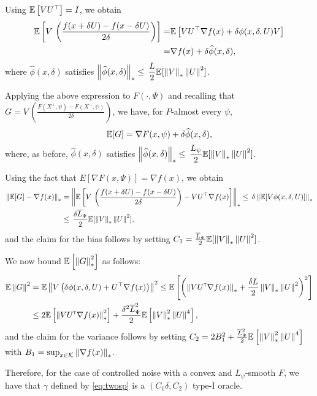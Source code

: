 Using $\mathbb{E}\left[V U^\top\right]=I$, we obtain
\begin{align*}
\mathbb{E}\left[V\,  \left(\frac{f(x+\delta U)  -f(x-\delta U)}{2\delta}\right)\right]=&
\mathbb{E}\left[ V U^\top\nabla f(x) +  \delta\phi(x,\delta,U) V \right]\\
= &  \nabla f(x) + \delta \widehat\phi(x,\delta),
\end{align*}
where $\widehat\phi(x,\delta)$ satisfies $\left\|\widehat\phi(x,\delta)\right\|_*  \le \, \dfrac{L}{2}\mathbb{E}[ \left\|V\right\|_* \left\|U\right\|^2]$.

Applying the above expression to $F(\cdot, \Psi)$ and recalling that $G=V\,  \left(\tfrac{F(X^+,\psi)  -F(X^-,\psi)}{2\delta}\right)$, we have, for $P$-almost every $\psi$, 
$$\mathbb{E}[G] = \nabla F(x,\psi) + \delta \widehat\phi(x,\delta),$$
where, as before, $\widehat\phi(x,\delta)$ satisfies $\left\|\widehat\phi(x,\delta)\right\|_*  \le \, \dfrac{L_{\psi}}{2}\mathbb{E}[ \left\|V\right\|_* \left\|U\right\|^2]$.

Using the fact that $E[\nabla F(x,\Psi)] = \nabla f(x)$, we obtain
\begin{align*}
 \left\|\mathbb{E}[G] - \nabla f(x)\right\|_*
 &= \left\|\mathbb{E}\left[V\,  \left(\frac{f(x+\delta U)  -f(x-\delta U)}{2\delta}\right)-V U^\top\nabla f(x) \right]\right\|_*
 \le \, \delta \left\|\mathbb{E}[ V \phi(x,\delta, U)]\right\|_*\\
 &\le \,\frac{\delta \overline{L}_{\Psi}}{2} \mathbb{E}[ \left\|V\right\|_* \left\|U\right\|^2],
\end{align*}
and the claim for the bias follows by setting $C_1= \frac{\overline{L}_{\Psi}}{2} \mathbb{E}[ \left\|V\right\|_* \left\|U\right\|^2]$.

We now bound $\mathbb{E}\left[ \left\|G\right\|_*^2\right]$ as follows:
\begin{align*}
 \mathbb{E} \left\|G\right\|^2
& = \mathbb{E}\left\|V\left(\delta \phi(x,\delta, U)+ U^\top\nabla f(x) \right)\right\|^2
 \le  \mathbb{E}\left[ \left( \left\| V U ^\mathsf{\scriptscriptstyle T} \nabla f(x)\right\|_* + \frac{\delta L}{2} \left\|V\right\|_* \left\|U\right\|^2 \right)^2\right]\\
& \le  2 \mathbb{E}\left[  \left\| V U ^\mathsf{\scriptscriptstyle T} \nabla f(x)\right\|_*^2\right]  + \frac{\delta^2 \overline{L}_{\Psi}^2}{2}\mathbb{E}\left[ \left\|V\right\|_*^2 \left\|U\right\|^4 \right],
\end{align*}
and the claim for the variance follows by setting $C_2 =  2 B_1^2  + \frac{ \overline{L}_{\Psi}^2}{2}\mathbb{E}\left[ \left\|V\right\|_*^2 \left\|U\right\|^4 \right]$ with $B_1 = \sup_{x\in \mathcal{K}} \left\|\nabla f(x)\right\|_*$.

Therefore, for the case of controlled noise with a convex and $L_{\psi}$-smooth $F$, we have that $\gamma$ defined by \eqref{eq:twosp} is a $(C_1\delta, C_2)$ type-I oracle.  


